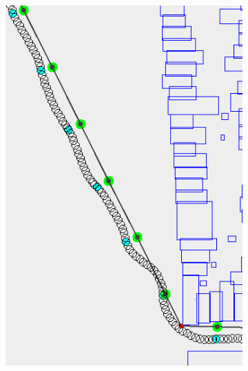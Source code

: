\begin{figure}[h]
	\centering
	
	\begin{subfigure}[t]{.45\textwidth}
        		\includegraphics[width=\textwidth]{img/sf-wavy2}
        		\caption{}
        		\label{fig:sf-wavy2}
	\end{subfigure}
	\hfill
	\begin{subfigure}[t]{.45\textwidth}

\end{subfigure}
\end{figure}
